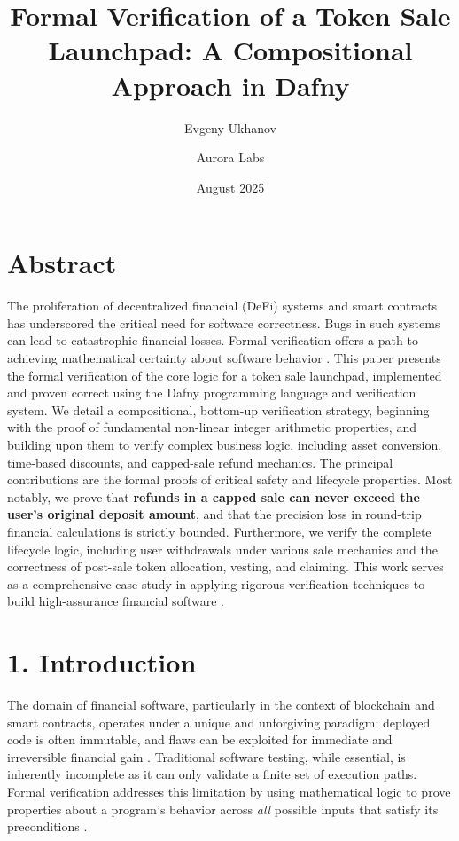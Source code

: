 \documentclass[
  english,
  onecolumn]{article}
\title{Formal Verification of a Token Sale Launchpad: A Compositional
Approach in Dafny}
\author{Evgeny Ukhanov \and Aurora Labs}
\date{August 2025}
\begin{document}
\maketitle

\section{Abstract}\label{abstract}

The proliferation of decentralized financial (DeFi) systems and smart
contracts has underscored the critical need for software correctness.
Bugs in such systems can lead to catastrophic financial losses. Formal
verification offers a path to achieving mathematical certainty about
software behavior \citep{borkowski2006formal}. This paper presents the
formal verification of the core logic for a token sale launchpad,
implemented and proven correct using the Dafny programming language and
verification system. We detail a compositional, bottom-up verification
strategy, beginning with the proof of fundamental non-linear integer
arithmetic properties, and building upon them to verify complex business
logic, including asset conversion, time-based discounts, and capped-sale
refund mechanics. The principal contributions are the formal proofs of
critical safety and lifecycle properties. Most notably, we prove that
\textbf{refunds in a capped sale can never exceed the user's original
deposit amount}, and that the precision loss in round-trip financial
calculations is strictly bounded. Furthermore, we verify the complete
lifecycle logic, including user withdrawals under various sale mechanics
and the correctness of post-sale token allocation, vesting, and
claiming. This work serves as a comprehensive case study in applying
rigorous verification techniques to build high-assurance financial
software \citep{atzei2017survey}.

\section{1. Introduction}\label{introduction}

The domain of financial software, particularly in the context of
blockchain and smart contracts, operates under a unique and unforgiving
paradigm: deployed code is often immutable, and flaws can be exploited
for immediate and irreversible financial gain
\citep{atzei2017survey, weir2018formal}. Traditional software testing,
while essential, is inherently incomplete as it can only validate a
finite set of execution paths. Formal verification addresses this
limitation by using mathematical logic to prove properties about a
program's behavior across \emph{all} possible inputs that satisfy its
preconditions \citep{woodcock2009formal, clarke1996formal}.
\end{document}
